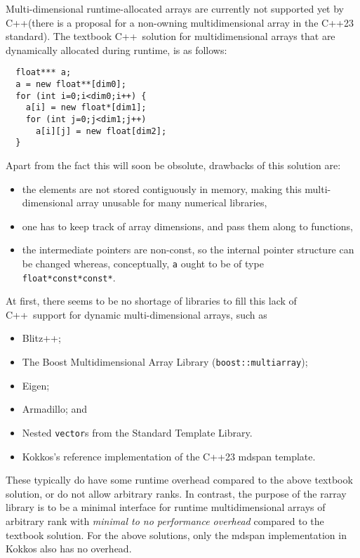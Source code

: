 \documentclass[11pt,twoside]{article}
\newcommand{\cxx}{C{++}}
\begin{document}
Multi-dimensional runtime-allocated arrays are currently not supported yet by
\cxx (there is a proposal for a non-owning multidimensional array in
the C++23 standard).
The textbook \cxx\ solution for multidimensional arrays that are
dynamically allocated during runtime, is as follows:
\vspace{-5pt}\begin{framed}\vspace{-14pt}%
\begin{verbatim}
  float*** a;
  a = new float**[dim0];
  for (int i=0;i<dim0;i++) {
    a[i] = new float*[dim1];
    for (int j=0;j<dim1;j++) 
      a[i][j] = new float[dim2];
  }
\end{verbatim}%
\vspace{-12pt}\end{framed}\vspace{-5pt}%
Apart from the fact this will soon be obsolute, drawbacks of this solution are:
\begin{itemize}
  \item the elements are not stored contiguously in memory, making
    this multi-dimensional array unusable
    for many numerical libraries,
  \item one has to keep track of array dimensions, and pass them along
    to functions,
  \item the intermediate pointers are non-const, so the
    internal pointer structure can be changed
    whereas, conceptually, \texttt{a} ought to be of type \texttt{float*const*const*}.
\end{itemize}
At first, there seems to be no shortage of libraries to fill this
lack of \cxx\ support for dynamic multi-dimensional arrays, such as
\begin{itemize}\itemsep 0pt \parskip 0pt
\item Blitz++;
\item The Boost Multidimensional Array Library (\texttt{boost::multiarray}); 
\item Eigen;
\item Armadillo; and
\item Nested \texttt{vector}s from the Standard Template Library.
\item Kokkos's reference implementation of the C++23 mdspan template.
\end{itemize}
These typically do have some runtime overhead compared to the above
textbook solution, or do not allow arbitrary ranks. In contrast, the purpose of the rarray
library is to be a minimal interface for runtime multidimensional
arrays of
arbitrary rank with
\emph{minimal to no performance overhead} compared to the textbook
solution.  For the above solutions, only the mdspan implementation in
Kokkos also has no overhead.
\end{document}
